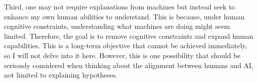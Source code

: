 \documentclass{article}
\begin{document}
Third, one may not require explanations from machines but instead seek to enhance my own human abilities to understand. This is because, under human cognitive constraints, understanding what machines are doing might seem limited. Therefore, the goal is to remove cognitive constraints and expand human capabilities. This is a long-term objective that cannot be achieved immediately, so I will not delve into it here. However, this is one possibility that should be seriously considered when thinking about the alignment between humans and AI, not limited to explaining hypotheses.



\end{document}
